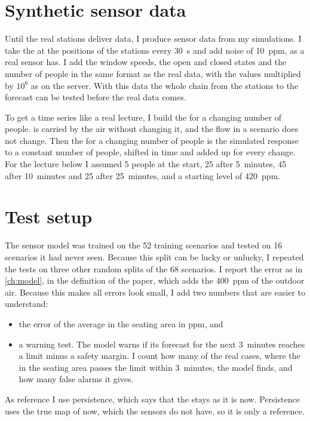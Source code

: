 \section{Synthetic sensor data}
Until the real stations deliver data, I produce sensor data from my simulations. I take the \cotwo{} at the
positions of the stations every 30~s and add noise of 10~ppm, as a real \cotwo{} sensor has. I add the window
speeds, the open and closed states and the number of people in the same format as the real data, with the
values multiplied by $10^6$ as on the server. With this data the whole chain from the stations to the forecast
can be tested before the real data comes.

To get a time series like a real lecture, I build the \cotwo{} for a changing number of people. \cotwo{} is
carried by the air without changing it, and the flow in a scenario does not change. Then the \cotwo{} for a
changing number of people is the simulated response to a constant number of people, shifted in time and added
up for every change. For the lecture below I assumed 5 people at the start, 25 after 5~minutes, 45 after
10~minutes and 25 after 25~minutes, and a starting level of 420~ppm.

\section{Test setup}
The sensor model was trained on the 52 training scenarios and tested on 16 scenarios it had never seen. Because
this split can be lucky or unlucky, I repeated the tests on three other random splits of the 68 scenarios. I
report the error as in \cref{ch:model}, in the definition of the paper, which adds the 400~ppm of the outdoor air.
Because this makes all errors look small, I add two numbers that are easier to understand:
\begin{itemize}
  \item the error of the average \cotwo{} in the seating area in ppm, and
  \item a warning test. The model warns if its forecast for the next 3~minutes reaches a limit minus a safety
        margin. I count how many of the real cases, where the \cotwo{} in the seating area passes the limit
        within 3~minutes, the model finds, and how many false alarms it gives.
\end{itemize}
As reference I use persistence, which says that the \cotwo{} stays as it is now. Persistence uses the true
\cotwo{} map of now, which the sensors do not have, so it is only a reference.

